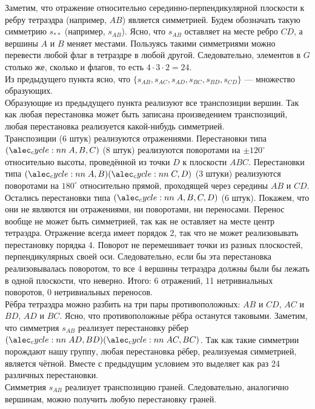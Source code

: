 \documentclass[a4paper,12pt]{article}
\begin{document}
    \begin{solution}
        \sub Заметим, что отражение относительно серединно-перпендикулярной плоскости к ребру тетраэдра (например, $AB$) является симметрией. Будем обозначать такую симметрию $s_{**}$ (например, $s_{AB}$). Ясно, что $s_{AB}$ оставляет на месте ребро $CD$, а вершины $A$ и $B$ меняет местами. Пользуясь такими симметриями можно перевести любой флаг в тетраэдре в любой другой. Следовательно, элементов в $G$ столько же, сколько и флагов, то есть $4 \cdot 3 \cdot 2 = 24$. \\
        \sub Из предыдущего пункта ясно, что $\{s_{AB}, s_{AC}, s_{AD}, s_{BC}, s_{BD}, s_{CD}\}$ --- множество образующих. \\
        \sub Образующие из предыдущего пункта реализуют все транспозиции вершин. Так как любая перестановка может быть записана произведением транспозиций, любая перестановка реализуется какой-нибудь симметрией. \\
        \sub Транспозиции (6 штук) реализуются отражениями. Перестановки типа $\cycle{A,B,C}$ (8 штук) реализуются поворотами на $\pm 120^\circ$ относительно высоты, проведённой из точки $D$ к плоскости $ABC$. Перестановки типа $\cycle{A,B}\cycle{C,D}$ (3 штуки) реализуются поворотами на $180^\circ$ относительно прямой, проходящей через середины $AB$ и $CD$. Остались перестановки типа $\cycle{A,B,C,D}$ (6 штук). Покажем, что они не являются ни отражениями, ни поворотами, ни переносами. Перенос вообще не может быть симметрией, так как не оставляет на месте центр тетраэдра. Отражение всегда имеет порядок 2, так что не может реализовывать перестановку порядка 4. Поворот не перемешивает точки из разных плоскостей, перпендикулярных своей оси. Следовательно, если бы эта перестановка реализовывалась поворотом, то все 4 вершины тетраэдра должны были бы лежать в одной плоскости, что неверно. Итого: 6 отражений, 11 нетривиальных поворотов, 0 нетривиальных переносов. \\
        \sub Рёбра тетраэдра можно разбить на три пары противоположных: $AB$ и $CD$, $AC$ и $BD$, $AD$ и $BC$. Ясно, что противоположные рёбра останутся таковыми. Заметим, что симметрия $s_{AB}$ реализует перестановку рёбер $\cycle{AD,BD}\cycle{AC,BC}$. Так как такие симметрии порождают нашу группу, любая перестановка рёбер, реализуемая симметрией, является чётной. Вместе с предыдущим условием это выделяет как раз 24 различных перестановки. \\
        \sub Симметрия $s_{AB}$ реализует транспозицию граней. Следовательно, аналогично вершинам, можно получить любую перестановку граней.
    \end{solution}  
    
\end{document}
